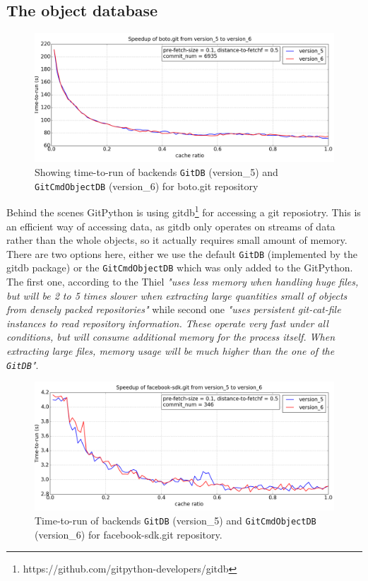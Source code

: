\documentclass[12pt,twoside,notitlepage]{report}
\begin{document}
\subsection{The object database}\label{dbbackend}

\begin{figure}[h]
\includegraphics[width=1.0\textwidth]{db_backend-1.png}
\caption{Showing time-to-run of backends \texttt{GitDB} (version\_5) and \texttt{GitCmdObjectDB} (version\_6) for boto.git repository}
\label{boto_gitdb}
\end{figure}

Behind the scenes GitPython is using gitdb\footnote{https://github.com/gitpython-developers/gitdb} for accessing a git reposiotry. This is an efficient way of accessing data, as gitdb only operates on streams of data rather than the whole objects, so it actually requires small amount of memory. There are two options here, either we use the default \texttt{GitDB} (implemented by the gitdb package) or the \texttt{GitCmdObjectDB} which was only added to the GitPython. The first one, according to the Thiel \textit{"uses less memory when handling huge files, but will be 2 to 5 times slower when extracting large quantities
small of objects from densely packed repositories"} while second one \textit{"uses persistent git-cat-file instances to read repository information. These operate very fast under all conditions, but will consume additional memory for the process itself. When extracting large files, memory
usage will be much higher than the one of the \texttt{GitDB}"}.
\begin{figure}[h]
\includegraphics[width=1.0\textwidth]{db_backend-2.png}
\caption{Time-to-run of backends \texttt{GitDB} (version\_5) and \texttt{GitCmdObjectDB} (version\_6) for facebook-sdk.git repository.}
\label{facebook-sdk_gitdb}
\end{figure}
\end{document}
